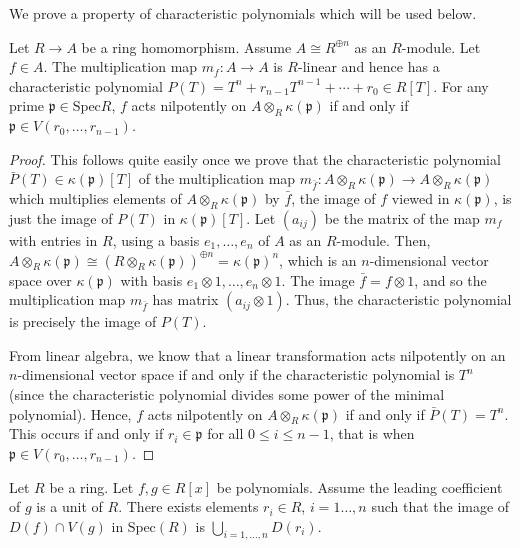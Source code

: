 \noindent
We prove a property of characteristic polynomials which
will be used below.

\begin{lemma}
\label{lemma-characteristic-polynomial-prime}
Let $R \to A$ be a ring homomorphism.
Assume $A \cong R^{\oplus n}$ as an $R$-module.
Let $f \in A$. The multiplication map $m_f: A
\to A$ is $R$-linear and hence
has a characteristic polynomial
$P(T) = T^n + r_{n-1}T^{n-1} + \cdots + r_0 \in R[T]$.
For any prime
$\mathfrak{p} \in \text{Spec} R$, $f$ acts nilpotently on $A
\otimes_R \kappa(\mathfrak{p})$ if and only if $\mathfrak p \in
V(r_0, \ldots, r_{n-1})$.
\end{lemma}

\begin{proof}
This follows quite easily once we prove that the characteristic
polynomial $\bar P(T) \in \kappa(\mathfrak p)[T]$ of the
multiplication map $m_{\bar f}: A \otimes_R \kappa(\mathfrak p) \to
A \otimes_R \kappa(\mathfrak p)$ which multiplies elements of $A
\otimes_R \kappa(\mathfrak p)$ by $\bar f$, the image of $f$ viewed in
$\kappa(\mathfrak p)$, is just the image of $P(T)$ in
$\kappa(\mathfrak p)[T]$. Let $(a_{ij})$ be the matrix of the map
$m_f$ with entries in $R$, using a basis $e_1, \ldots, e_n$
of $A$ as an $R$-module.
Then, $A \otimes_R \kappa(\mathfrak p) \cong (R \otimes_R
\kappa(\mathfrak p))^{\oplus n} = \kappa(\mathfrak p)^n$, which is
an $n$-dimensional vector space over $\kappa(\mathfrak p)$ with
basis $e_1 \otimes 1, \ldots, e_n \otimes 1$. The image $\bar f = f
\otimes 1$, and so the multiplication map $m_{\bar f}$ has matrix
$(a_{ij} \otimes 1)$. Thus, the characteristic polynomial is
precisely the image of $P(T)$.

\medskip\noindent
From linear algebra, we know that a linear transformation acts
nilpotently on an $n$-dimensional vector space if and only if the
characteristic polynomial is $T^n$ (since the characteristic
polynomial divides some power of the minimal polynomial). Hence,
$f$ acts nilpotently on $A \otimes_R \kappa(\mathfrak p)$ if and
only if $\bar P(T) = T^n$. This occurs if and only if $r_i \in
\mathfrak p$ for all $0 \leq i \leq n - 1$, that is when $\mathfrak p \in
V(r_0, \ldots, r_{n - 1}).$
\end{proof}

\begin{lemma}
\label{lemma-affineline-special}
Let $R$ be a ring. Let $f, g \in R[x]$ be polynomials.
Assume the leading coefficient of $g$ is a unit of $R$.
There exists elements $r_i\in R$, $i = 1\ldots, n$ such that
the image of $D(f) \cap V(g)$ in $\text{Spec}(R)$ is
$\bigcup_{i = 1, \ldots, n} D(r_i)$.
\end{lemma}

